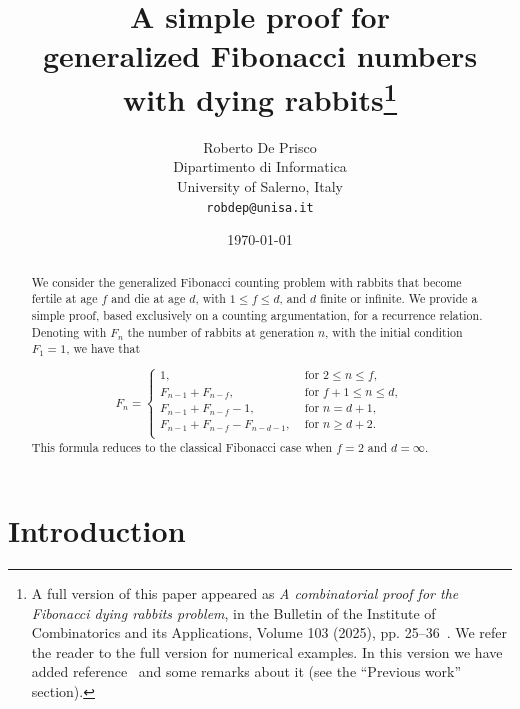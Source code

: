 \documentclass[11pt,epsf]{article}
\newcommand{\cfor}{{\text{ for }}}
\begin{document}
\title{A simple proof for \\generalized Fibonacci numbers with dying rabbits\footnote{
A full version of this paper appeared as {\em A combinatorial proof for the Fibonacci dying rabbits problem}, in the Bulletin of the Institute of Combinatorics and
its Applications, Volume 103 (2025), pp. 25--36~\cite{D2025}. We refer the reader to the full version for numerical examples.
In this version we have added reference~\cite{F2011} and some remarks about it (see the ``Previous work'' section).}}
\author{Roberto De Prisco\\
{\small Dipartimento di Informatica}\\
{\small University of Salerno, Italy}\\
{\small\tt robdep@unisa.it}}
\date{\today}
\maketitle

\begin{abstract}
We consider the generalized Fibonacci counting problem with rabbits that become
fertile at age $f$ and die at age $d$, with $1\le f\le d$, and $d$ finite or infinite. 
We provide a simple proof, based exclusively on a counting argumentation, for a recurrence relation.
Denoting with $F_n$ the number of rabbits at generation $n$, with the initial condition $F_1=1$, we have that

\begin{equation*}
F_n = 
\begin{cases}
1,                                         & \cfor 2\le n\le f,\\
F_{n-1}+F_{n-f},                   & \cfor f+1\le n\le d,\\
F_{n-1}+F_{n-f}-1,              & \cfor n=d+1,\\
F_{n-1}+F_{n-f}-F_{n-d-1}, & \cfor n\ge d+2.\\
\end{cases}
\end{equation*}
\noindent
This formula reduces to the classical Fibonacci case when $f=2$ and $d=\infty$.
\end{abstract}

\section{Introduction}
\end{document}
